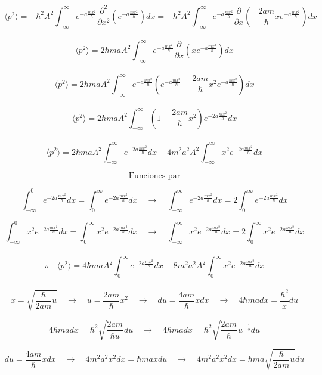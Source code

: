 \documentclass[10pt,a4papper]{article}
\begin{document}
\[\langle p^2\rangle=
-\hbar^2 A^2\int_{-\infty}^\infty e^{-a\frac{mx^2}{\hbar}}\frac{\partial^2}{\partial x^2}\left(e^{-a\frac{mx^2}{\hbar}}\right)dx=
-\hbar^2 A^2\int_{-\infty}^\infty e^{-a\frac{mx^2}{\hbar}}\frac{\partial}{\partial x}\left(-\frac{2am}{\hbar}xe^{-a\frac{mx^2}{\hbar}}\right)dx\]\\

\[\langle p^2\rangle=
2\hbar maA^2\int_{-\infty}^\infty e^{-a\frac{mx^2}{\hbar}}\frac{\partial}{\partial x}\left(xe^{-a\frac{mx^2}{\hbar}}\right)dx\]\\

\[\langle p^2\rangle=
2\hbar maA^2\int_{-\infty}^\infty e^{-a\frac{mx^2}{\hbar}}\left(e^{-a\frac{mx^2}{\hbar}}-\frac{2am}{\hbar}x^2e^{-a\frac{mx^2}{\hbar}}\right)dx\]\\

\[\langle p^2\rangle=
2\hbar maA^2\int_{-\infty}^\infty\left(1-\frac{2am}{\hbar}x^2\right)e^{-2a\frac{mx^2}{\hbar}}dx\]\\

\[\langle p^2\rangle=
2\hbar maA^2\int_{-\infty}^\infty e^{-2a\frac{mx^2}{\hbar}}dx
-4m^2a^2A^2\int_{-\infty}^\infty x^2e^{-2a\frac{mx^2}{\hbar}}dx\]

\newpage
\[\text{Funciones par}\]

\[\int_{-\infty}^0 e^{-2a\frac{mx^2}{\hbar}}dx=\int_0^\infty e^{-2a\frac{mx^2}{\hbar}}dx\quad\to\quad
\int_{-\infty}^\infty e^{-2a\frac{mx^2}{\hbar}}dx=2\int_0^\infty e^{-2a\frac{mx^2}{\hbar}}dx\]

\[\int_{-\infty}^0 x^2e^{-2a\frac{mx^2}{\hbar}}dx=\int_0^\infty x^2e^{-2a\frac{mx^2}{\hbar}}dx\quad\to\quad
\int_{-\infty}^\infty x^2e^{-2a\frac{mx^2}{\hbar}}dx=2\int_0^\infty x^2e^{-2a\frac{mx^2}{\hbar}}dx\]\\

\[\therefore\quad\langle p^2\rangle=
4\hbar maA^2\int_0^\infty e^{-2a\frac{mx^2}{\hbar}}dx
-8m^2a^2A^2\int_0^\infty x^2e^{-2a\frac{mx^2}{\hbar}}dx\]\]\\

\[x=\sqrt{\frac{\hbar}{2am}u}\quad\to\quad u=\frac{2am}{\hbar}x^2\quad\to\quad du=\frac{4am}{\hbar}xdx\quad\to\quad 4\hbar madx=\frac{\hbar^2}{x}du\]

\[4\hbar madx=\hbar^2\sqrt{\frac{2am}{\hbar u}}du\quad\to\quad\boxed{4\hbar madx=\hbar^2\sqrt{\frac{2am}{\hbar}}u^{-\frac{1}{2}}du}\]

\[du=\frac{4am}{\hbar}xdx\quad\to\quad 4m^2a^2x^2dx=\hbar maxdu\quad\to\quad 4m^2a^2x^2dx=\hbar ma\sqrt{\frac{\hbar}{2am}u}du\]
\end{document}
